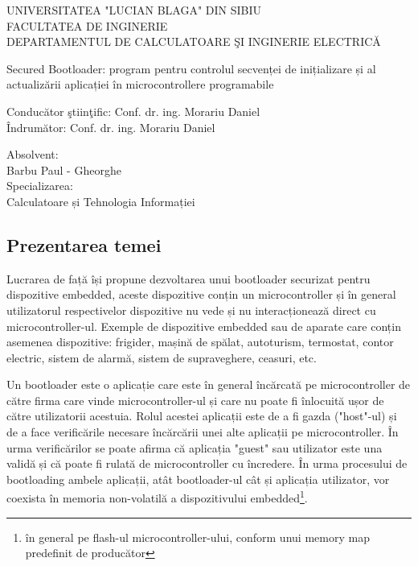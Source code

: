 \documentclass[12pt,a4paper,titlepage]{report}
\author{Barbu Paul - Gheorghe}
\begin{document}
\begin{titlepage}
{
\centering
UNIVERSITATEA "LUCIAN BLAGA" DIN SIBIU\\
FACULTATEA DE INGINERIE \\
DEPARTAMENTUL DE CALCULATOARE ŞI INGINERIE ELECTRICĂ\\
}

\vfill

{
\centering
\Large
Secured Bootloader: program pentru controlul secvenței de
inițializare și al actualizării aplicației în microcontrollere
programabile
}

\vfill
{
\raggedright
Conducător ştiinţific: Conf. dr. ing. Morariu Daniel \\
Îndrumător: Conf. dr. ing. Morariu Daniel
}
\vfill

{
\raggedright
\hspace*{160pt}Absolvent: \\
\hspace*{160pt}Barbu Paul - Gheorghe\\
\hspace*{160pt}Specializarea:\\
\hspace*{160pt}Calculatoare și Tehnologia Informației
}

\end{titlepage}

\tableofcontents
\newpage

\subsection*{Prezentarea temei}

Lucrarea de față își propune dezvoltarea unui bootloader securizat pentru dispozitive embedded, aceste dispozitive conțin un microcontroller și în general utilizatorul respectivelor dispozitive nu vede și nu interacționează direct cu microcontroller-ul. Exemple de dispozitive embedded sau de aparate care conțin asemenea dispozitive: frigider, mașină de spălat, autoturism, termostat, contor electric, sistem de alarmă, sistem de supraveghere, ceasuri, etc.

Un bootloader este o aplicație care este în general încărcată pe microcontroller de către firma care vinde microcontroller-ul și care nu poate fi înlocuită ușor de către utilizatorii acestuia.
Rolul acestei aplicații este de a fi gazda ("host"-ul) și de a face verificările necesare încărcării unei alte aplicații pe microcontroller. În urma verificărilor se poate afirma că aplicația "guest" sau utilizator este una validă și că poate fi rulată de microcontroller cu încredere.
În urma procesului de bootloading ambele aplicații, atât bootloader-ul cât și aplicația utilizator, vor coexista în
memoria non-volatilă a dispozitivului embedded\footnote{în general pe flash-ul microcontroller-ului, conform unui memory map predefinit de producător}.
 
\end{document}
